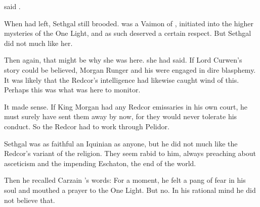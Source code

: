  said \Esmerel.





\new
When \Esmerel had left, Sethgal still brooded. 
\Esmerel was a Vaimon of \iquin, initiated into the higher mysteries of the One Light, and as such deserved a certain respect. 
But Sethgal did not much like her. 


Then again, that might be why she was here. 
 she had said.
If Lord Curwen's story could be believed, Morgan Runger and his \ishrah were engaged in dire blasphemy. 
It was likely that the Redcor's intelligence had likewise caught wind of this.
Perhaps this was what \Esmerel was here to monitor. 

It made sense.
If King Morgan had any Redcor emissaries in his own court, he must surely have sent them away by now, for they would never tolerate his conduct. 
So the Redcor had to work through Pelidor. 


Sethgal was as faithful an Iquinian as anyone, but he did not much like the Redcor's variant of the religion. 
They seem rabid to him, always preaching about asceticism and the impending Eschaton, the end of the world. 

Then he recalled Carzain \Shachar's words:
For a moment, he felt a pang of fear in his soul and mouthed a prayer to the One Light. 
But no. 
In his rational mind he did not believe that. 






